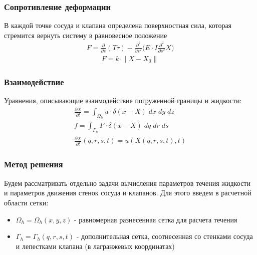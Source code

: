 \documentclass[14pt]{beamer}
\begin{document}
\begin{frame}
\frametitle{Сопротивление деформации}
В каждой точке сосуда и клапана определена поверхностная сила, которая стремится вернуть систему в равновесное положение
\begin{gather}
    \label{eq:strain_energy}
    F =  \frac{\partial}{\partial s}(T \tau) + \frac{\partial^2}{\partial s^2} \Big( E \cdot I \frac{\partial^2}{\partial s^2} X \Big)
\end{gather}
\begin{gather}
    \label{eq:define_boundary_force}
    F = k \cdot \|X - X_0\|
\end{gather}
\end{frame}

\begin{frame}
\frametitle{Взаимодействие}
Уравнения, описывающие взаимодействие погруженной границы и жидкости:
\begin{gather}
    \label{eq:ibm_velocity}
    \frac{\partial X}{\partial t} = \int_{\Omega_h} u \cdot \delta (\bar{x} - X)\; dx\; dy\; dz \\
    \label{eq:ibm_force}
    f = \int_{\Gamma_h} F \cdot \delta (\bar{x} - X)\; dq\; dr\; ds\\
    \label{eq:no_slip}
    \frac{\partial X}{\partial t} (q, r, s, t) = u(X(q, r, s, t), t)
\end{gather}
\end{frame}

\begin{frame}
\frametitle{Метод решения}
Будем рассматривать отдельно задачи вычисления параметров течения жидкости и параметров движения стенок сосуда и клапанов. Для этого введем в расчетной области сетки:
\begin{itemize}
    \item[\MVRightarrow] $\Omega_h = \Omega_h(x, y, z)$ - равномерная разнесенная сетка для расчета течения
    \item[\MVRightarrow] $\Gamma_h = \Gamma_h(q, r, s, t)$ - дополнительная сетка, соотнесенная со стенками сосуда и лепестками клапана (в лагранжевых координатах)
\end{itemize}

\end{frame}
\end{document}

